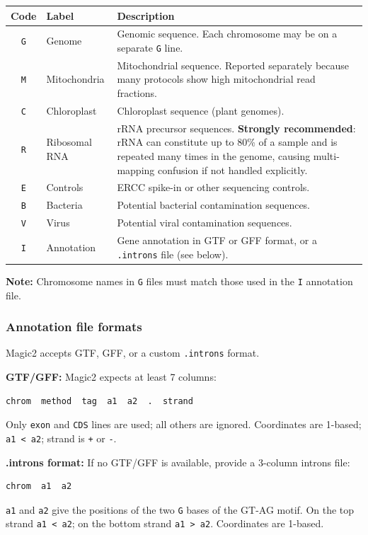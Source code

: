 \documentclass[11pt]{article}
\newcommand{\code}[1]{\texttt{#1}}
\begin{document}
\begin{center}
\begin{tabular}{clp{8.5cm}}
\toprule
\textbf{Code} & \textbf{Label} & \textbf{Description} \\
\midrule
\code{G} & Genome
  & Genomic sequence.  Each chromosome may be on a separate \code{G} line. \\
\code{M} & Mitochondria
  & Mitochondrial sequence.  Reported separately because many protocols
    show high mitochondrial read fractions. \\
\code{C} & Chloroplast
  & Chloroplast sequence (plant genomes). \\
\code{R} & Ribosomal RNA
  & rRNA precursor sequences.  \textbf{Strongly recommended}: rRNA can
    constitute up to 80\% of a sample and is repeated many times in the
    genome, causing multi-mapping confusion if not handled explicitly. \\
\code{E} & Controls
  & ERCC spike-in or other sequencing controls. \\
\code{B} & Bacteria
  & Potential bacterial contamination sequences. \\
\code{V} & Virus
  & Potential viral contamination sequences. \\
\code{I} & Annotation
  & Gene annotation in GTF or GFF format, or a \code{.introns} file
    (see below). \\
\bottomrule
\end{tabular}
\end{center}

\begin{notebox}
\textbf{Note:} Chromosome names in \code{G} files must match those
used in the \code{I} annotation file.
\end{notebox}

\subsubsection{Annotation file formats}

Magic2 accepts GTF, GFF, or a custom \code{.introns} format.

\textbf{GTF/GFF:} Magic2 expects at least 7 columns:
\begin{lstlisting}
chrom  method  tag  a1  a2  .  strand
\end{lstlisting}
Only \code{exon} and \code{CDS} lines are used; all others are ignored.
Coordinates are 1-based; \code{a1 < a2}; strand is \code{+} or \code{-}.

\textbf{.introns format:} If no GTF/GFF is available, provide a
3-column introns file:
\begin{lstlisting}
chrom  a1  a2
\end{lstlisting}
\code{a1} and \code{a2} give the positions of the two \texttt{G} bases
of the GT-AG motif.  On the top strand \code{a1 < a2}; on the bottom
strand \code{a1 > a2}. Coordinates are 1-based.
\end{document}
